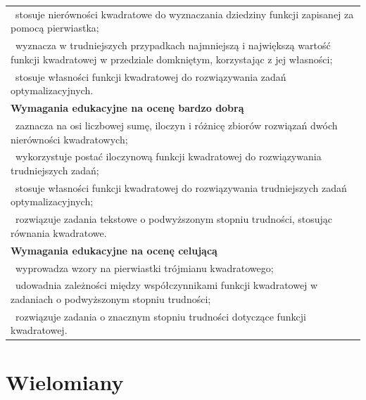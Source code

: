 \documentclass[12pt,a4paper]{article}
\begin{document}
\begin{longtable}{|p{16cm}|}
		\textbullet\ stosuje nierówności kwadratowe do wyznaczania dziedziny funkcji zapisanej za pomocą pierwiastka; \\
		
		\textbullet\ wyznacza w trudniejszych przypadkach najmniejszą i największą wartość funkcji kwadratowej w przedziale domkniętym, korzystając z jej własności; \\
		
		\textbullet\ stosuje własności funkcji kwadratowej do rozwiązywania zadań optymalizacyjnych. \\ \hline
		
		\textbf{Wymagania edukacyjne na ocenę bardzo dobrą} \\ \hline
		
		\textbullet\ zaznacza na osi liczbowej sumę, iloczyn i różnicę zbiorów rozwiązań dwóch nierówności kwadratowych; \\
		
		\textbullet\ wykorzystuje postać iloczynową funkcji kwadratowej do rozwiązywania trudniejszych zadań; \\
		
		\textbullet\ stosuje własności funkcji kwadratowej do rozwiązywania trudniejszych zadań optymalizacyjnych; \\
		
		\textbullet\ rozwiązuje zadania tekstowe o podwyższonym stopniu trudności, stosując równania kwadratowe. \\ \hline
		
		\textbf{Wymagania edukacyjne na ocenę celującą} \\ \hline
		
		\textbullet\ wyprowadza wzory na pierwiastki trójmianu kwadratowego; \\
		
		\textbullet\ udowadnia zależności między współczynnikami funkcji kwadratowej w zadaniach o podwyższonym stopniu trudności; \\
		
		\textbullet\ rozwiązuje zadania o znacznym stopniu trudności dotyczące funkcji kwadratowej. \\ \hline
		
	\end{longtable}
	
	\section{Wielomiany}
	
\end{document}
